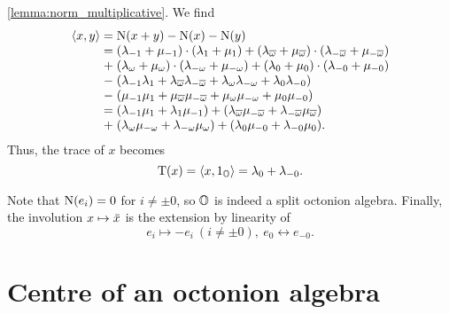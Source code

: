 \ref{lemma:norm_multiplicative}. We find
\begin{equation}
	\begin{array}{r@{\;}c@{\;}l}
		\inner{x}{y} & = & \NN(x+y) - \NN(x) - \NN(y) \\
		
		    & = & (\lambda_{-1} + \mu_{-1}) \cdot ( \lambda_1 + \mu_1 )
		
			 +  (\lambda_{\bar{\omega}} + \mu_{\bar{\omega}}) \cdot
					(\lambda_{- \bar{\omega}} + \mu_{-\bar{\omega}}) \\
					
			& + & (\lambda_{\omega} + \mu_{\omega}) \cdot	
					( \lambda_{-\omega} + \mu_{-\omega} ) 
					
			 +  (\lambda_0 + \mu_0) \cdot (\lambda_{-0} + \mu_{-0}) \\
			
			& - & ( \lambda_{-1} \lambda_1 + \lambda_{\bar{\omega}} \lambda_{-\bar{\omega}}
					+ \lambda_{\omega} \lambda_{-\omega} + \lambda_0 \lambda_{-0} ) \\
			
			& - & ( \mu_{-1} \mu_1 + \mu_{\bar{\omega}} \mu_{-\bar{\omega}}
					+ \mu_{\omega} \mu_{-\omega} + \mu_0 \mu_{-0} ) \\
					
			& = & ( \lambda_{-1} \mu_{1} + \lambda_{1} \mu_{-1} )
			
			+ ( \lambda_{\bar{\omega}} \mu_{-\bar{\omega}} + 
					\lambda_{-\bar{\omega}} \mu_{\bar{\omega}} ) \\
					
			& + & ( \lambda_{\omega} \mu_{-\omega} + \lambda_{-\omega} \mu_{\omega} )
			
			+ ( \lambda_{0} \mu_{-0} + \lambda_{-0} \mu_{0} ).
	\end{array}
\end{equation}
Thus, the trace of $x$ becomes
\begin{equation}
	\operatorname{T}(x) = \langle x, 1_{\mathbb{O}} \rangle = \lambda_0 + \lambda_{-0}.
\end{equation}

Note that $\mathord{\mathrm{N}}(e_i) = 0$ for $i \neq \pm 0$, so $\mathbb{O}$ is indeed a split octonion algebra.
Finally, the involution $x \mapsto \mathord{\mbox{\hspace*{0pt}}\,\overline{\!x\!\!\;}\!\:}\mbox{\hspace*{0pt}}$ is the extension by linearity of
\begin{equation}
	e_i \mapsto - e_i\ (i \neq \pm 0),\ e_0 \leftrightarrow e_{-0}.
\end{equation}

\section{Centre of an octonion algebra}


